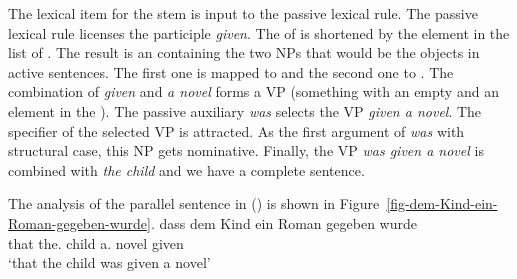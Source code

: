 \noindent
The lexical item for the stem  is input to the passive lexical rule. The passive lexical
rule licenses the participle \emph{given}. The \argst of  is shortened by the element in
the \da list of  . The result is an \argstl containing the two NPs that would be the
objects in active sentences. The first one  is mapped to \spr and the second one 
to \comps. The combination of \emph{given} and \emph{a novel} forms a VP (something with an empty
\compsl and an element in the \sprl). The passive auxiliary \emph{was} selects the VP \emph{given a
  novel}. 
The specifier of the selected VP  is attracted. As the first argument of
\emph{was} with structural case, this NP gets nominative. Finally, the VP \emph{was given a novel}
is combined with \emph{the child} and we have a complete sentence.

The analysis of the parallel  sentence in () is shown in
Figure~\vref{fig-dem-Kind-ein-Roman-gegeben-wurde}.
\ea
\gll dass dem Kind ein Roman gegeben wurde\\
     that the.\DAT{} child a.\NOM{} novel  given    \AUX\\\german
\glt `that the child was given a novel'
\z

